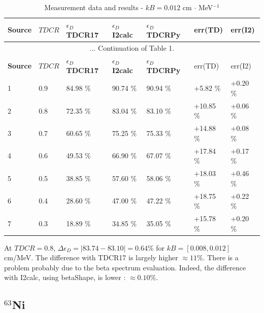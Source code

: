 \documentclass[12pt]{iopart}
\begin{document}
\begingroup
\footnotesize
\begin{longtable}[l]{| p{} | p{} |p{} |p{} |p{} |p{} |p{} |} 
\caption{Measurement data and results - $kB = 0.012$ cm $\cdot$ MeV$^{-1}$}
\label{Table1} \\ 
\hline
\textbf{Source} & \textbf{$TDCR$} & \textbf{$\epsilon_{D}$ TDCR17} & \textbf{$\epsilon_{D}$ I2calc} & \textbf{$\epsilon_{D}$ TDCRPy} & err(TD)& err(I2) \\ 
\endfirsthead
\multicolumn{7}{c}{... Continuation of Table 1.}\\ 
\hline
 \textbf{Source} & \textbf{$TDCR$} & \textbf{$\epsilon_{D}$ TDCR17} & \textbf{$\epsilon_{D}$ I2calc} & \textbf{$\epsilon_{D}$ TDCRPy} & err(TD)& err(I2) \\   \hline 
\endhead
\hline
 1 & 0.9   &  84.98 \% & 90.74 \% & 90.94 \% & +5.82 \%  & +0.20 \% \\
 2 & 0.8   &  72.35 \% & 83.04 \% & 83.10 \% & +10.85 \% & +0.06 \% \\
 3 & 0.7   &  60.65 \% & 75.25 \% & 75.33 \% & +14.88 \% & +0.08 \% \\
 4 & 0.6   &  49.53 \% & 66.90 \% & 67.07 \% & +17.84 \% & +0.17 \% \\
 5 & 0.5   &  38.85 \% & 57.60 \% & 58.06 \% & +18.03 \% & +0.46 \% \\
 6 & 0.4   &  28.60 \% & 47.00 \% & 47.22 \% & +18.75 \% & +0.22 \% \\
 7 & 0.3   &  18.89 \% & 34.85 \% & 35.05 \% & +15.78 \% & +0.20 \% \\
\hline
\end{longtable} 
\endgroup

At $TDCR = 0.8$, $\Delta \epsilon_D = |83.74 - 83.10| = 0.64 \%$ for $kB = [0.008, 0.012]$ cm/MeV. The difference with TDCR17 is largely higher $\approx 11 \%$. There is a problem probably due to the beta spectrum evaluation. Indeed, the difference with I2calc, using betaShape, is lower :  $\approx 0.10 \%$. 


\pagebreak
\subsection{$^{63}$Ni}
\end{document}

